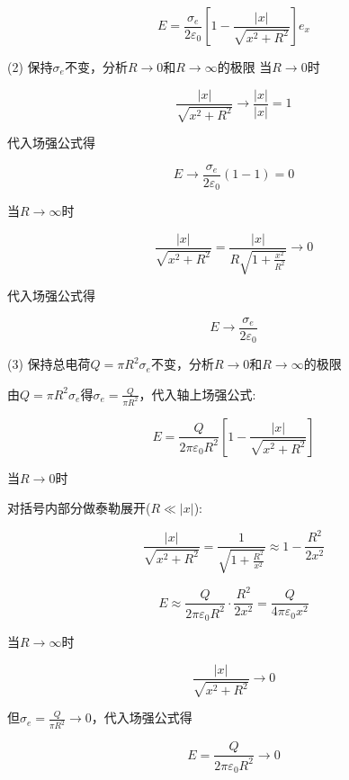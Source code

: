 \documentclass{article}
\begin{document}
$$E = \frac{\sigma_e}{2\varepsilon_0} \left[ 1 - \frac{|x|}{\sqrt{x^2 + R^2}} \right] e_x$$


 (2) 保持$\sigma_e$不变，分析$R\to0$和$R\to\infty$的极限
当$R\to0$时

$$\frac{|x|}{\sqrt{x^2 + R^2}} \to \frac{|x|}{|x|} = 1$$

代入场强公式得

$$E \to \frac{\sigma_e}{2\varepsilon_0} \left( 1 - 1 \right) = 0$$

当$R\to\infty$时

$$\frac{|x|}{\sqrt{x^2 + R^2}} = \frac{|x|}{R\sqrt{1 + \frac{x^2}{R^2}}} \to 0$$

代入场强公式得

$$E \to \frac{\sigma_e}{2\varepsilon_0}$$

 (3) 保持总电荷$Q=\pi R^2\sigma_e$不变，分析$R\to0$和$R\to\infty$的极限

由$Q=\pi R^2\sigma_e$得$\sigma_e = \frac{Q}{\pi R^2}$，代入轴上场强公式:

$$E = \frac{Q}{2\pi\varepsilon_0 R^2} \left[ 1 - \frac{|x|}{\sqrt{x^2 + R^2}} \right]$$

当$R\to0$时

对括号内部分做泰勒展开($R\ll|x|$):

$$\frac{|x|}{\sqrt{x^2 + R^2}} = \frac{1}{\sqrt{1 + \frac{R^2}{x^2}}} \approx 1 - \frac{R^2}{2x^2}$$

$$E \approx \frac{Q}{2\pi\varepsilon_0 R^2} \cdot \frac{R^2}{2x^2} = \frac{Q}{4\pi\varepsilon_0 x^2}$$

当$R\to\infty$时

$$\frac{|x|}{\sqrt{x^2 + R^2}} \to 0$$

但$\sigma_e = \frac{Q}{\pi R^2}\to0$，代入场强公式得

$$E = \frac{Q}{2\pi\varepsilon_0 R^2} \to 0$$
\end{document}
